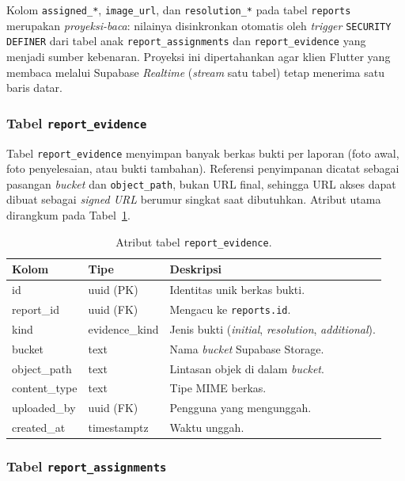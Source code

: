 Kolom \texttt{assigned\_*}, \texttt{image\_url}, dan \texttt{resolution\_*} pada tabel \texttt{reports} merupakan \textit{proyeksi-baca}: nilainya disinkronkan otomatis oleh \textit{trigger} \texttt{SECURITY DEFINER} dari tabel anak \texttt{report\_assignments} dan \texttt{report\_evidence} yang menjadi sumber kebenaran. Proyeksi ini dipertahankan agar klien Flutter yang membaca melalui Supabase \textit{Realtime} (\textit{stream} satu tabel) tetap menerima satu baris datar.

\subsubsection{Tabel \texttt{report\_evidence}}

Tabel \texttt{report\_evidence} menyimpan banyak berkas bukti per laporan (foto awal, foto penyelesaian, atau bukti tambahan). Referensi penyimpanan dicatat sebagai pasangan \textit{bucket} dan \texttt{object\_path}, bukan URL final, sehingga URL akses dapat dibuat sebagai \textit{signed URL} berumur singkat saat dibutuhkan. Atribut utama dirangkum pada Tabel~\ref{tab:report-evidence}.

\begin{table}[htbp]
\centering
\caption{Atribut tabel \texttt{report\_evidence}.}
\label{tab:report-evidence}
\small
\begin{tabular}{p{3.4cm} p{2.6cm} p{6.5cm}}
\toprule
\textbf{Kolom} & \textbf{Tipe} & \textbf{Deskripsi} \\
\midrule
id & uuid (PK) & Identitas unik berkas bukti. \\
report\_id & uuid (FK) & Mengacu ke \texttt{reports.id}. \\
kind & evidence\_kind & Jenis bukti (\textit{initial}, \textit{resolution}, \textit{additional}). \\
bucket & text & Nama \textit{bucket} Supabase Storage. \\
object\_path & text & Lintasan objek di dalam \textit{bucket}. \\
content\_type & text & Tipe MIME berkas. \\
uploaded\_by & uuid (FK) & Pengguna yang mengunggah. \\
created\_at & timestamptz & Waktu unggah. \\
\bottomrule
\end{tabular}
\end{table}

\subsubsection{Tabel \texttt{report\_assignments}}


